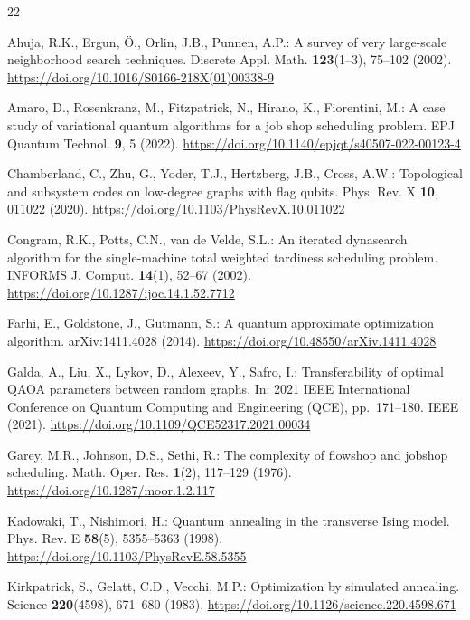 \documentclass[11pt,a4paper]{article}
\begin{document}
\begin{thebibliography}{22}

Ahuja, R.K., Ergun, \"{O}., Orlin, J.B., Punnen, A.P.: A survey of very
large-scale neighborhood search techniques. Discrete Appl. Math.
\textbf{123}(1--3), 75--102 (2002).
\url{https://doi.org/10.1016/S0166-218X(01)00338-9}

Amaro, D., Rosenkranz, M., Fitzpatrick, N., Hirano, K., Fiorentini, M.:
A case study of variational quantum algorithms for a job shop scheduling
problem. EPJ Quantum Technol. \textbf{9}, 5 (2022).
\url{https://doi.org/10.1140/epjqt/s40507-022-00123-4}

Chamberland, C., Zhu, G., Yoder, T.J., Hertzberg, J.B., Cross, A.W.:
Topological and subsystem codes on low-degree graphs with flag qubits.
Phys. Rev. X \textbf{10}, 011022 (2020).
\url{https://doi.org/10.1103/PhysRevX.10.011022}

Congram, R.K., Potts, C.N., van de Velde, S.L.: An iterated dynasearch
algorithm for the single-machine total weighted tardiness scheduling
problem. INFORMS J. Comput. \textbf{14}(1), 52--67 (2002).
\url{https://doi.org/10.1287/ijoc.14.1.52.7712}

Farhi, E., Goldstone, J., Gutmann, S.: A quantum approximate
optimization algorithm. arXiv:1411.4028 (2014).
\url{https://doi.org/10.48550/arXiv.1411.4028}

Galda, A., Liu, X., Lykov, D., Alexeev, Y., Safro, I.: Transferability of
optimal QAOA parameters between random graphs. In: 2021 IEEE
International Conference on Quantum Computing and Engineering (QCE),
pp.\ 171--180. IEEE (2021).
\url{https://doi.org/10.1109/QCE52317.2021.00034}

Garey, M.R., Johnson, D.S., Sethi, R.: The complexity of flowshop and
jobshop scheduling. Math. Oper. Res. \textbf{1}(2), 117--129 (1976).
\url{https://doi.org/10.1287/moor.1.2.117}

Kadowaki, T., Nishimori, H.: Quantum annealing in the transverse Ising
model. Phys. Rev. E \textbf{58}(5), 5355--5363 (1998).
\url{https://doi.org/10.1103/PhysRevE.58.5355}

Kirkpatrick, S., Gelatt, C.D., Vecchi, M.P.: Optimization by simulated
annealing. Science \textbf{220}(4598), 671--680 (1983).
\url{https://doi.org/10.1126/science.220.4598.671}


\end{thebibliography}
\end{document}
